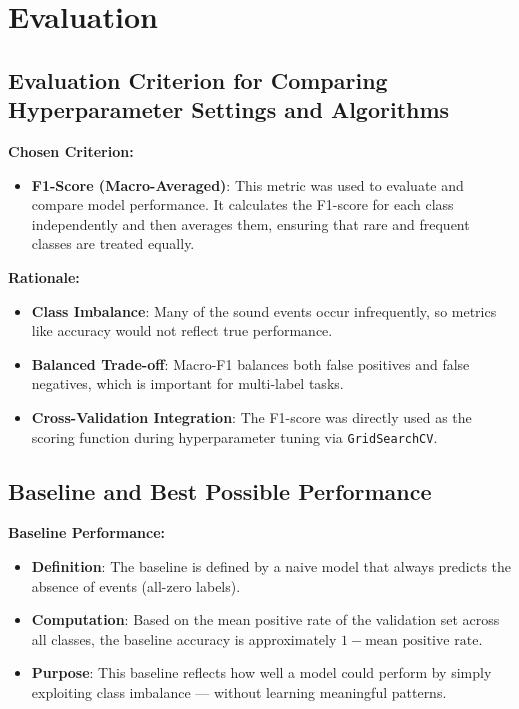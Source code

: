 \documentclass{article}
\begin{document}
\section{Evaluation}

\subsection{Evaluation Criterion for Comparing Hyperparameter Settings and Algorithms}

\textbf{Chosen Criterion:}
\begin{itemize}
    \item \textbf{F1-Score (Macro-Averaged)}: This metric was used to evaluate and compare model performance. It calculates the F1-score for each class independently and then averages them, ensuring that rare and frequent classes are treated equally.
\end{itemize}

\textbf{Rationale:}
\begin{itemize}
    \item \textbf{Class Imbalance}: Many of the sound events occur infrequently, so metrics like accuracy would not reflect true performance.
    \item \textbf{Balanced Trade-off}: Macro-F1 balances both false positives and false negatives, which is important for multi-label tasks.
    \item \textbf{Cross-Validation Integration}: The F1-score was directly used as the scoring function during hyperparameter tuning via \texttt{GridSearchCV}.
\end{itemize}

\subsection{Baseline and Best Possible Performance}

\textbf{Baseline Performance:}
\begin{itemize}
    \item \textbf{Definition}: The baseline is defined by a naive model that always predicts the absence of events (all-zero labels).
    \item \textbf{Computation}: Based on the mean positive rate of the validation set across all classes, the baseline accuracy is approximately \( 1 - \text{mean positive rate} \).
    \item \textbf{Purpose}: This baseline reflects how well a model could perform by simply exploiting class imbalance — without learning meaningful patterns.
\end{itemize}
\end{document}
